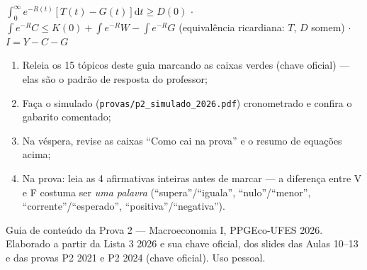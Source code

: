 \documentclass[12pt, a4paper]{article}
\newcommand{\dif}{\mathrm{d}}
\begin{document}
\begin{formulabox}[title={Política fiscal (cap.\ 12)}]
$\int_0^\infty e^{-R(t)}[T(t)-G(t)]\dif t \geq D(0)$
\quad$\cdot$\quad
$\int e^{-R}C \leq K(0) + \int e^{-R}W - \int e^{-R}G$ (equivalência
ricardiana: $T$, $D$ somem)
\quad$\cdot$\quad
$I = Y - C - G$
\end{formulabox}

\begin{provabox}[title={Roteiro final de estudo}]
\begin{enumerate}[leftmargin=1.6em, itemsep=0.15em]
\item Releia os 15 tópicos deste guia marcando as caixas verdes (chave
oficial) --- elas são o padrão de resposta do professor;
\item Faça o simulado (\texttt{provas/p2\_simulado\_2026.pdf}) cronometrado e
confira o gabarito comentado;
\item Na véspera, revise as caixas ``Como cai na prova'' e o resumo de
equações acima;
\item Na prova: leia as 4 afirmativas inteiras antes de marcar --- a diferença
entre V e F costuma ser \emph{uma palavra} (``supera''/``iguala'',
``nulo''/``menor'', ``corrente''/``esperado'', ``positiva''/``negativa'').
\end{enumerate}
\end{provabox}

\vfill
{\small\color{grayrbc} Guia de conteúdo da Prova 2 --- Macroeconomia I,
PPGEco-UFES 2026. Elaborado a partir da Lista 3 2026 e sua chave oficial, dos
slides das Aulas 10--13 e das provas P2 2021 e P2 2024 (chave oficial). Uso
pessoal.}
\end{document}
